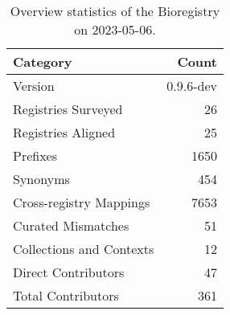 \begin{table}
\caption{Overview statistics of the Bioregistry on 2023-05-06.}
\label{tab:bioregistry-summary}
\begin{tabular}{lr}
\toprule
Category & Count \\
\midrule
Version & 0.9.6-dev \\
Registries Surveyed & 26 \\
Registries Aligned & 25 \\
Prefixes & 1650 \\
Synonyms & 454 \\
Cross-registry Mappings & 7653 \\
Curated Mismatches & 51 \\
Collections and Contexts & 12 \\
Direct Contributors & 47 \\
Total Contributors & 361 \\
\bottomrule
\end{tabular}
\end{table}

